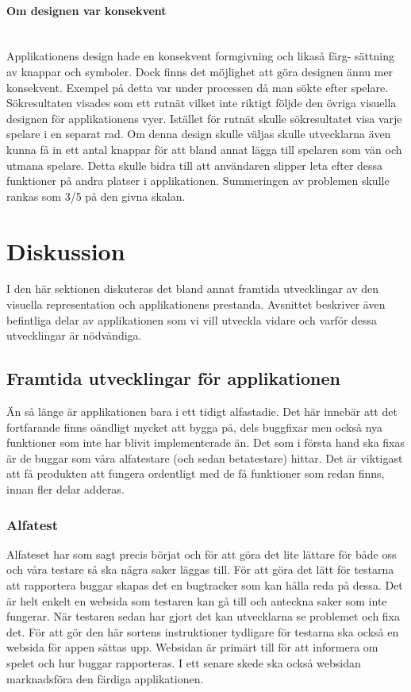 \documentclass[a4paper, 11pt]{article}
\begin{document}
\paragraph{Om designen var konsekvent}\mbox{}\\
Applikationens design hade en konsekvent formgivning och likaså färg-
sättning av knappar och symboler. Dock finns det möjlighet att göra designen ännu mer konsekvent. Exempel på detta var under processen då man sökte efter spelare. Sökresultaten visades som ett rutnät vilket inte riktigt följde den övriga visuella designen för applikationens vyer. Istället för rutnät skulle sökresultatet visa varje spelare i en separat rad. Om denna design skulle väljas skulle utvecklarna även kunna få in ett antal knappar för att bland annat lägga till spelaren som vän och utmana spelare. Detta skulle bidra till att användaren slipper leta efter dessa funktioner på andra platser i applikationen.
Summeringen av problemen skulle rankas som 3/5 på den givna skalan.

\newpage
\section{Diskussion}
I den här sektionen diskuteras det bland annat framtida utvecklingar av den visuella representation och applikationens prestanda. Avsnittet beskriver även befintliga delar av applikationen som vi vill utveckla vidare och varför dessa utvecklingar är nödvändiga.

\subsection{Framtida utvecklingar för applikationen}
Än så länge är applikationen bara i ett tidigt alfastadie. Det här innebär att det fortfarande finns oändligt mycket att bygga på, dels buggfixar men också nya funktioner som inte har blivit implementerade än. Det som i första hand ska fixas är de buggar som våra alfatestare (och sedan betatestare) hittar. Det är viktigast att få produkten att fungera ordentligt med de få funktioner som redan finns, innan fler delar adderas. 

\subsubsection{Alfatest}
Alfateset har som sagt precis börjat och för att göra det lite lättare för både oss och våra testare så ska några saker läggas till. För att göra det lätt för testarna att rapportera buggar skapas det en bugtracker som kan hålla reda på dessa. Det är helt enkelt en websida som testaren kan gå till och anteckna saker som inte fungerar. När testaren sedan har gjort det kan utvecklarna se problemet och fixa det. För att gör den här sortens instruktioner tydligare för testarna ska också en websida för appen sättas upp. Websidan är primärt till för att informera om spelet och hur buggar rapporteras. I ett senare skede ska också websidan marknadsföra den färdiga applikationen.
\end{document}
